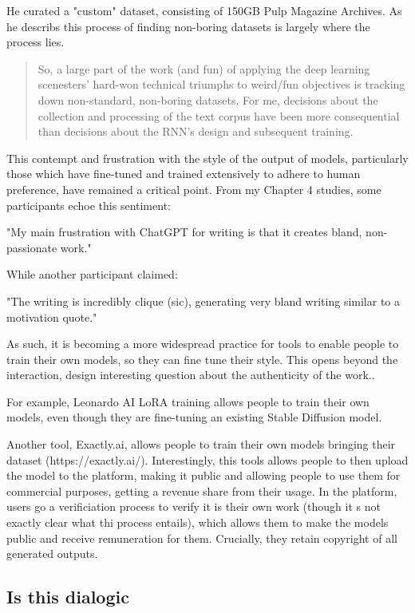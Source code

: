 He curated a "custom" dataset, consisting of 150GB Pulp Magazine Archives. As he describs this process of finding non-boring datasets is largely where the process lies. 
\begin{quote}
    So, a large part of the work (and fun) of applying the deep learning scenesters’ hard-won technical triumphs to weird/fun objectives is tracking down non-standard, non-boring datasets. For me, decisions about the collection and processing of the text corpus have been more consequential than decisions about the RNN’s design and subsequent training.
\end{quote}

This contempt and frustration with the style of the output of models, particularly those which have fine-tuned and trained extensively to adhere to human preference, have remained a critical point. From my Chapter 4 studies, some participants echoe this sentiment: 


"My main frustration with ChatGPT for writing is that it creates bland, non-passionate work."

While another participant claimed: 

"The writing is incredibly clique (sic), generating very bland writing similar to a motivation quote."


As such, it is becoming a more widespread practice for tools to enable people to train their own models, so they can fine tune their style. This opens beyond the interaction, design interesting question about the authenticity of the work.. 

For example, Leonardo AI LoRA training allows people to train their own models, even though they are fine-tuning an existing Stable Diffusion model. 

Another tool, Exactly.ai, allows people to train their own models bringing their dataset (https://exactly.ai/). Interestingly, this tools allows people to then  upload the model to the platform, making it public and allowing people to use them for commercial purposes, getting a revenue share from their usage. In the platform, users go a verificiation process to verify it is their own work (though it s not exactly clear what thi process entails), which allows them to make the models public and receive remuneration for them. Crucially, they retain copyright of all generated outputs. 



\subsection{Is this dialogic}

